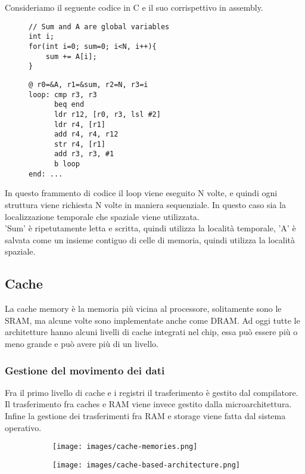 \noindent Consideriamo il seguente codice in C e il suo corrispettivo in assembly.
\begin{figure}[!h]
\begin{minipage}[t]{0.45\linewidth}
\centering
\begin{lstlisting}
// Sum and A are global variables
int i;
for(int i=0; sum=0; i<N, i++){
    sum += A[i];
}
\end{lstlisting}
\end{minipage}
\hspace{.35cm}
\begin{minipage}[t]{0.45\linewidth}
\begin{lstlisting}[language={[x86masm]Assembler}]
@ r0=&A, r1=&sum, r2=N, r3=i
loop: cmp r3, r3
      beq end
      ldr r12, [r0, r3, lsl #2]
      ldr r4, [r1]
      add r4, r4, r12
      str r4, [r1]
      add r3, r3, #1
      b loop
end: ...
\end{lstlisting}
\end{minipage}
\end{figure}

In questo frammento di codice il loop viene eseguito N volte, e quindi ogni struttura viene richiesta N volte in maniera sequenziale. In questo caso sia la localizzazione temporale che spaziale viene utilizzata.\\
'Sum' è ripetutamente letta e scritta, quindi utilizza la località temporale, 'A' è salvata come un insieme contiguo di celle di memoria, quindi utilizza la località spaziale.

\subsection{Cache}
La cache memory è la memoria più vicina al processore, solitamente sono le SRAM, ma alcune volte sono implementate anche come DRAM. Ad oggi tutte le architetture hanno alcuni livelli di cache integrati nel chip, essa può essere più o meno grande e può avere più di un livello.

\subsubsection{Gestione del movimento dei dati}
Fra il primo livello di cache e i registri il trasferimento è gestito dal compilatore. Il trasferimento fra caches e RAM viene invece gestito dalla microarchitettura. Infine la gestione dei trasferimenti fra RAM e storage viene fatta dal sistema operativo.

\begin{figure}[h!]
    \centering
    \begin{subfigure}{.45\textwidth}
        \centering
        \texttt{[image: images/cache-memories.png]}
        \caption{}
    \end{subfigure}
    \begin{subfigure}{.45\textwidth}
        \centering
        \texttt{[image: images/cache-based-architecture.png]}
        \caption{}
    \end{subfigure}
\end{figure}
    


